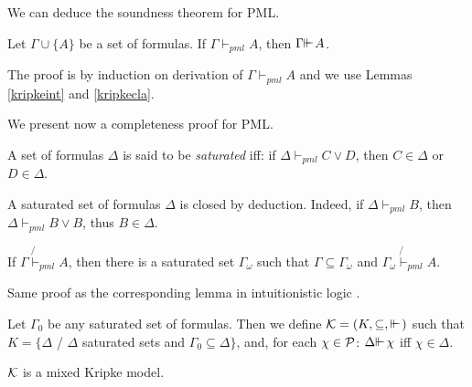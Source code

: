 \documentclass{jancl}
\begin{document}
We can deduce the soundness theorem for PML.
\begin{theorem}
Let ${\Gamma} \cup \{ A \}$ be a set of formulas.
If ${\Gamma} {\vdash}_{pml} A$, then ${\Gamma} {\ifmmode{ {\vdash}\mkern-7.6mu
{\vdash}\mkern2mu}\else{ {\vdash}\kern-.28em
{\vdash}\hskip1pt\ }\fi\relax} A$.
\end{theorem}

\begin{proof*}
The proof is by induction on derivation of ${\Gamma} {\vdash}_{pml} A$ and we
use Lemmas \ref{kripkeint} and \ref{kripkecla}.
\end{proof*}

We present now a completeness proof for PML.
\begin{definition}
A set of formulas ${\Delta}$ is said to be \emph{saturated} iff: if ${\Delta}
{\vdash}_{pml} C {\vee} D$, then $C \in {\Delta}$ or $D \in {\Delta}$.
\end{definition}

\begin{remark} {A saturated set of formulas ${\Delta}$ is closed by deduction. Indeed, if ${\Delta}
{\vdash}_{pml} B$, then ${\Delta} {\vdash}_{pml} B {\vee} B$, thus $B \in {\Delta}$.}
\end{remark}

\begin{lemma}
If ${\Gamma} \not {\vdash}_{pml}  A$, then there is a saturated set ${\Gamma}_{\omega}$ such that ${\Gamma} {\subseteq} {\Gamma}_{\omega}$ and
${\Gamma}_{\omega} \not {\vdash}_{pml}  A$.
\end{lemma}

\begin{proof*}
Same proof as the corresponding lemma in intuitionistic logic
\cite{DNR:2001,DAL:1994}.
\end{proof*}

\begin{definition}
Let ${\Gamma}_0$ be any saturated set of formulas. Then we define ${\cal K}
= (K , {\subseteq} , {\ifmmode{ {\vdash}\mkern-7.6mu
{\vdash}\mkern2mu}\else{ {\vdash}\kern-.28em
{\vdash}\hskip1pt\ }\fi\relax})$ such that $K = \{ {\Delta}$ / ${\Delta}$ saturated sets
and ${\Gamma}_0 {\subseteq} {\Delta} \}$, and, for each ${\chi} \in {\cal P}$: ${\Delta}
{\ifmmode{ {\vdash}\mkern-7.6mu
{\vdash}\mkern2mu}\else{ {\vdash}\kern-.28em
{\vdash}\hskip1pt\ }\fi\relax} {\chi}$ iff ${\chi} \in {\Delta}$.
\end{definition}

\begin{lemma} \label{kmodel}
${\cal K}$ is a  mixed Kripke model.
\end{lemma}
\end{document}
